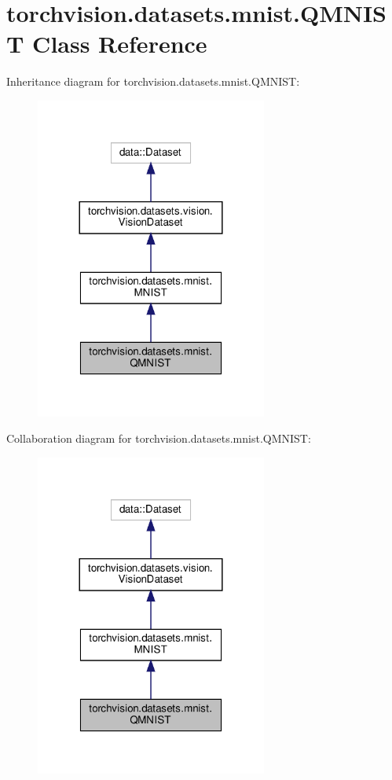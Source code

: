 \hypertarget{classtorchvision_1_1datasets_1_1mnist_1_1QMNIST}{}\section{torchvision.\+datasets.\+mnist.\+Q\+M\+N\+I\+ST Class Reference}
\label{classtorchvision_1_1datasets_1_1mnist_1_1QMNIST}


Inheritance diagram for torchvision.\+datasets.\+mnist.\+Q\+M\+N\+I\+ST\+:
\nopagebreak
\begin{figure}[H]
\begin{center}
\leavevmode
\includegraphics[width=216pt]{classtorchvision_1_1datasets_1_1mnist_1_1QMNIST__inherit__graph}
\end{center}
\end{figure}


Collaboration diagram for torchvision.\+datasets.\+mnist.\+Q\+M\+N\+I\+ST\+:
\nopagebreak
\begin{figure}[H]
\begin{center}
\leavevmode
\includegraphics[width=216pt]{classtorchvision_1_1datasets_1_1mnist_1_1QMNIST__coll__graph}
\end{center}
\end{figure}
